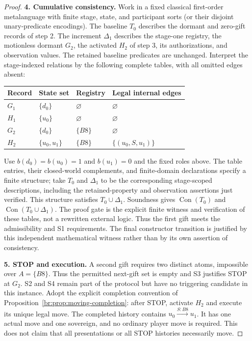 \documentclass[11pt,letterpaper]{article}
\theoremstyle{definition}\newtheorem{definition}[theorem]{Definition}\newtheorem{example}[theorem]{Example}
\theoremstyle{remark}\newtheorem{remark}[theorem]{Remark}
\newcommand{\Con}{\operatorname{Con}}
\begin{document}
\begin{proof}
\textbf{4. Cumulative consistency.} Work in a fixed classical first-order metalanguage with finite stage, state, and participant sorts (or their disjoint unary-predicate encodings). The baseline $T_0$ describes the dormant and zero-gift records of step 2. The increment $\Delta_1$ describes the stage-one registry, the motionless dormant $G_2$, the activated $H_2$ of step 3, its authorizations, and observation values. The retained baseline predicates are unchanged. Interpret the stage-indexed relations by the following complete tables, with all omitted edges absent:
\begin{center}\small
\begin{tabular}{@{}llll@{}}
\toprule
Record & State set & Registry & Legal internal edges \\
\midrule
$G_1$ & $\{d_0\}$ & $\varnothing$ & $\varnothing$ \\
$H_1$ & $\{u_0\}$ & $\varnothing$ & $\varnothing$ \\
$G_2$ & $\{d_0\}$ & $\{B8\}$ & $\varnothing$ \\
$H_2$ & $\{u_0,u_1\}$ & $\{B8\}$ & $\{(u_0,S,u_1)\}$ \\
\bottomrule
\end{tabular}
\end{center}
Use $b(d_0)=b(u_0)=1$ and $b(u_1)=0$ and the fixed roles above. The table entries, their closed-world complements, and finite-domain declarations specify a finite structure; take $T_0$ and $\Delta_1$ to be the corresponding stage-scoped descriptions, including the retained-property and observation assertions just verified. This structure satisfies $T_0\cup\Delta_1$. Soundness gives $\Con(T_0)$ and $\Con(T_0\cup\Delta_1)$. The proof gate is the explicit finite witness and verification of these tables, not a rewritten external logic. Thus the first gift meets the admissibility and S1 requirements. The final constructor transition is justified by this independent mathematical witness rather than by its own assertion of consistency.

\textbf{5. STOP and execution.} A second gift requires two distinct atoms, impossible over $A=\{B8\}$. Thus the permitted next-gift set is empty and S3 justifies STOP at $G_2$. S2 and S4 remain part of the protocol but have no triggering candidate in this instance. Adopt the explicit completion convention of Proposition~\ref{br:prop:moving-completion}: after STOP, activate $H_2$ and execute its unique legal move. The completed history contains $u_0\xrightarrow{S:B8}u_1$. It has one actual move and one sovereign, and no ordinary player move is required. This does not claim that all presentations or all STOP histories necessarily move.


\end{proof}
\end{document}
